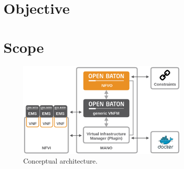 
\section{Objective}




\doit

\section{Scope}



\begin{figure}[H]
    \centering
    \includegraphics[width=0.75\textwidth]{resources/images/architecture.png}
    \caption[Conceptual architecture]{Conceptual architecture.}
    \label{fig:conceptual_architecture}
\end{figure}

